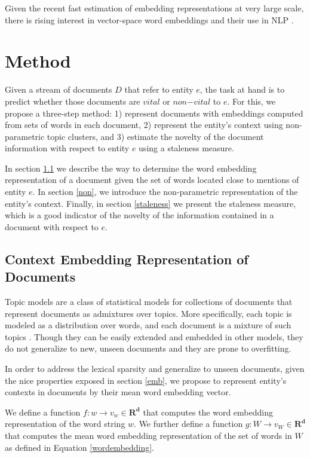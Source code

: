 \documentclass{article}
\begin{document}
Given the recent fast estimation of embedding representations at very large scale, there is rising interest in vector-space word embeddings and their use in NLP \cite{Arvind14}.

\section{Method}
\label{approach}

Given a stream of documents $D$ that refer to entity $e$, the task at hand is to predict whether those documents are $vital$ or $non\mathord{-}vital$ to $e$. For this, we propose a three-step method: 1) represent documents with embeddings computed from sets of words in each document, 2) represent the entity's context using non-parametric topic clusters, and 3) estimate the novelty of the document information with respect to entity $e$ using a staleness measure.

In section \ref{docwordemb} we describe the way to determine the word embedding representation of a document given the set of words located close to mentions of entity $e$. In section \ref{non}, we introduce the non-parametric representation of the entity's context. Finally, in section \ref{staleness} we present the staleness measure, which is a good indicator of the novelty of the information contained in a document with respect to $e$.

\subsection{Context Embedding Representation of Documents}
\label{docwordemb}

Topic models are a class of statistical models for collections of documents that represent documents as admixtures over topics. More specifically, each topic is modeled as a distribution over words, and each document is a mixture of such topics \cite{InouyeRD14}. Though they can be easily extended and embedded in other models, they do not generalize to new, unseen documents and they are prone to overfitting. 

In order to address the lexical sparsity and generalize to unseen documents, given the nice properties exposed in section \ref{emb}, we propose to represent entity's contexts in documents by their mean word embedding vector.

We define a function $f : w \rightarrow v_w \in \mathbf{R^d}$ that computes the word embedding representation of the word string $w$. We further define a function $g : W \rightarrow v_W \in \mathbf{R^d}$ that computes the mean word embedding representation of the set of words in $W$ as defined in Equation \ref{wordembedding}.
\end{document}
